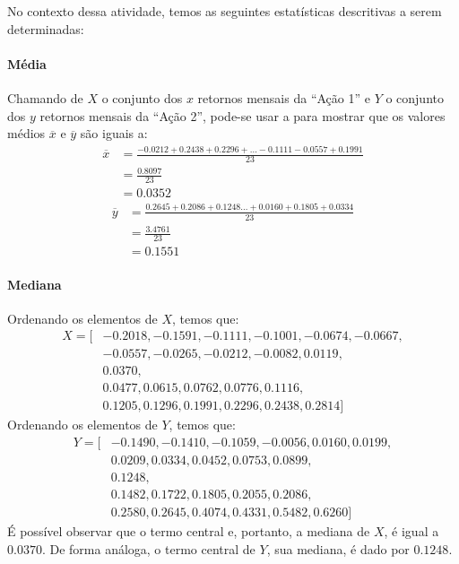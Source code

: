 \begin{resolucao}
No contexto dessa atividade, temos as seguintes estatísticas descritivas a
serem determinadas:

\paragraph{Média}
Chamando de $X$ o conjunto dos $x$ retornos mensais da ``Ação 1'' e $Y$ o
conjunto dos $y$ retornos mensais da ``Ação 2'', pode-se usar a
 para mostrar que os valores médios $\overline{x}$ e
$\overline{y}$ são iguais a:
\begin{align*}
    \overline{x} &= \frac{-0.0212 + 0.2438 + 0.2296 + \ldots -0.1111 - 0.0557 + 0.1991}{23} \\
                 &= \frac{0.8097}{23} \\
                 &= 0.0352
\end{align*}
\begin{align*}
    \overline{y} &= \frac{0.2645 + 0.2086 + 0.1248 \ldots + 0.0160 + 0.1805 + 0.0334}{23} \\
                 &= \frac{3.4761}{23} \\
                 &= 0.1551
\end{align*}

\paragraph{Mediana}
Ordenando os elementos de $X$, temos que:
\begin{align*}
    X = [& -0.2018, -0.1591, -0.1111, -0.1001, -0.0674, -0.0667, \\
         & -0.0557, -0.0265, -0.0212, -0.0082, 0.0119, \\
         & 0.0370, \\
         & 0.0477, 0.0615, 0.0762, 0.0776, 0.1116, \\
         & 0.1205, 0.1296, 0.1991, 0.2296, 0.2438, 0.2814 ]
\end{align*}
Ordenando os elementos de $Y$, temos que:
\begin{align*}
    Y = [& -0.1490, -0.1410, -0.1059, -0.0056, 0.0160, 0.0199, \\
         & 0.0209, 0.0334, 0.0452, 0.0753, 0.0899, \\
         & 0.1248, \\
         & 0.1482, 0.1722, 0.1805, 0.2055, 0.2086, \\
         & 0.2580, 0.2645, 0.4074, 0.4331, 0.5482, 0.6260 ]
\end{align*}
É possível observar que o termo central e, portanto, a mediana de $X$, é
igual a $0.0370$. De forma análoga, o termo central de $Y$, sua mediana, é
dado por $0.1248$.


\end{resolucao}
